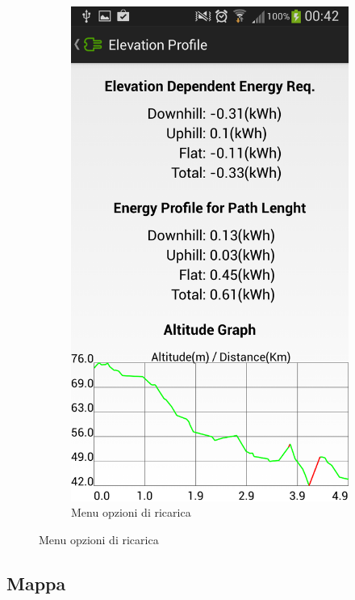 \begin{figure}
\begin{subfigure}{0.45\textwidth}
		\includegraphics[width=\textwidth]{assets/mobile-app-altimetry-3.png}
		\caption{Menu opzioni di ricarica}
		\label{fig:altimetry-3}
    \end{subfigure}
\end{figure}

\subsection{Mappa}\label{subsec:map}

